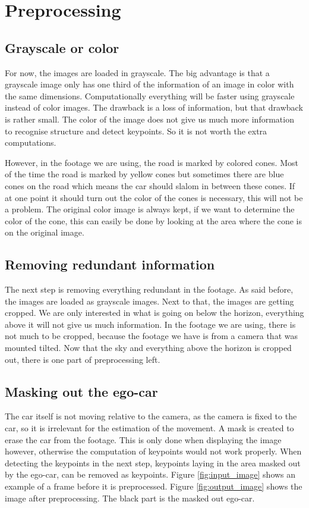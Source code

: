 \section{Preprocessing}
\subsection{Grayscale or color}
For now, the images are loaded in grayscale. The big advantage is that a grayscale image only has one third of the information of an image in color with the same dimensions. Computationally everything will be faster using grayscale instead of color images. The drawback is a loss of information, but that drawback is rather small. The color of the image does not give us much more information to recognise structure and detect keypoints. So it is not worth the extra computations.\bigskip

However, in the footage we are using, the road is marked by colored cones. Most of the time the road is marked by yellow cones but sometimes there are blue cones on the road which means the car should slalom in between these cones. If at one point it should turn out the color of the cones is necessary, this will not be a problem. The original color image is always kept, if we want to determine the color of the cone, this can easily be done by looking at the area where the cone is on the original image.

\subsection{Removing redundant information}
The next step is removing everything redundant in the footage. As said before, the images are loaded as grayscale images. Next to that, the images are getting cropped. We are only interested in what is going on below the horizon, everything above it will not give us much information. In the footage we are using, there is not much to be cropped, because the footage we have is from a camera that was mounted tilted. Now that the sky and everything above the horizon is cropped out, there is one part of preprocessing left.

\subsection{Masking out the ego-car}
The car itself is not moving relative to the camera, as the camera is fixed to the car, so it is irrelevant for the estimation of the movement. A mask is created to erase the car from the footage. This is only done when displaying the image however, otherwise the computation of keypoints would not work properly. When detecting the keypoints in the next step, keypoints laying in the area masked out by the ego-car, can be removed as keypoints. Figure \autoref{fig:input_image} shows an example of a frame before it is preprocessed. Figure \autoref{fig:output_image} shows the image after preprocessing. The black part is the masked out ego-car.

